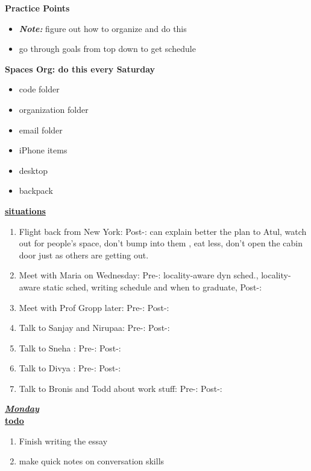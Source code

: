 \textbf{Practice Points}\\
\begin{itemize}
\item \textit{\textbf{Note:}} figure out how to organize and do this
\item go through goals from top down to get schedule
\end{itemize}

\textbf{Spaces Org: do this every Saturday }
\begin{itemize}
\item code folder
\item organization folder
\item email folder
\item iPhone items
\item desktop
\item backpack
\end{itemize}

\underline{\textbf{situations}} \\
\begin{enumerate}

\item Flight back from New York: Post-: can explain better the plan to Atul, watch out for people's space, don't bump into them , eat less, don't open the cabin door just as others are getting out.

\item Meet with Maria on Wednesday: Pre-: locality-aware dyn sched., locality-aware static sched, writing schedule and when to graduate,  Post-:

\item Meet with Prof Gropp later: Pre-:  Post-:

\item Talk to Sanjay and Nirupaa: Pre-:    Post-: 
\item Talk to Sneha : Pre-: Post-:
\item Talk to Divya : Pre-: Post-:
\item Talk to Bronis and Todd about work stuff:  Pre-:  Post-:

\end{enumerate}

\underline{\textbf{\textit{Monday}}}\\
\underline{\textbf{todo}}\\
\begin{enumerate}
\item Finish writing the essay 
\item make quick notes on conversation skills 
\end{enumerate}

